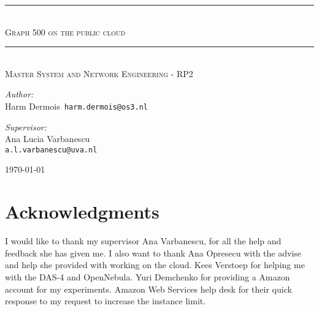 \documentclass[A4]{scrartcl}
\newcommand{\HRule}{\rule{\linewidth}{0.5mm}}
\begin{document}
\begin{titlepage}
	\begin{center}
		
		\HRule \\[0.5cm]
		\textsc{\LARGE Graph 500 on the public cloud}\\[0.5cm]
		\HRule \\[0.3cm]
		
		\textsc{\large{Master System and Network Engineering - RP2}}\\[0.5cm]
		
		\vfill
		
		\begin{minipage}[t]{0.4\textwidth}
			\begin{flushleft} \large 
				\emph{Author:}\\
				Harm Dermois\texttt{ harm.dermois@os3.nl}
			\end{flushleft}
		\end{minipage}%
		\begin{minipage}[t]{0.4\textwidth}
			\begin{flushleft} \large
				\emph{Supervisor:} \\
				Ana Lucia Varbanescu \\
				\texttt{a.l.varbanescu@uva.nl}\\				
			\end{flushleft}
		\end{minipage}
		
	\end{center}
	
	\vspace{2cm}

		
		
		\vfill
		
		{\large \today}
		
\end{titlepage}


\newpage



\newpage

\section*{Acknowledgments}
I would like to thank my supervisor Ana Varbanescu, for all the help and feedback she has given me. I also want to thank Ana Opresecu with the advise and help she provided with working on the cloud. Kees Verstoep for helping me with the DAS-4 and OpenNebula. Yuri Demchenko for providing a Amazon account for my experiments. Amazon Web Services help desk for their quick response to my request to increase the instance limit.
\end{document}
